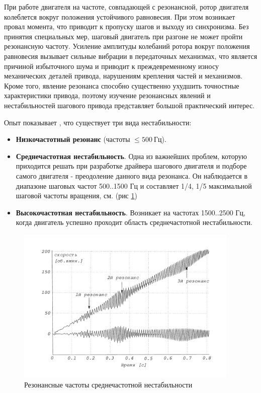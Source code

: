 При работе двигателя на частоте, совпадающей с резонансной, ротор двигателя колеблется вокруг
положения устойчивого равновесия. При этом возникает провал момента, что приводит к пропуску шагов и
выходу из синхронизма. Без принятия специальных мер, шаговый двигатель при разгоне не может пройти резонансную
частоту. Усиление амплитуды колебаний ротора вокруг положения равновесия вызывает сильные вибрации в
передаточных механизмах, что является причиной избыточного шума и приводит к преждевременному износу
механических деталей привода, нарушениям крепления частей и механизмов. Кроме того,
явление резонанса способно существенно ухудшить точностные характеристики привода, поэтому изучение
резонансных явлений и нестабильностей шагового привода представляет большой практический интерес.

Опыт показывает \cite[гл. 9]{RatmirovIvobotenko}, что существует три вида нестабильности:
\begin{itemize}
    \item \textbf{Низкочастотный резонанс} (частоты $ \le 500 ~\textit{Гц}$).

    \item \textbf{Среднечастотная нестабильность}. Одна из важнейших проблем, которую приходится решать при
            разработке драйвера шагового двигателя и подборе самого двигателя - преодоление данного
            вида резонанса. Он наблюдается в диапазоне шаговых частот 500..1500 Гц и составляет
            1/4, 1/5 максимальной шаговой частоты вращения, см. (рис \ref{pic_step_motor_reisonance_plot})

    \item \textbf{Высокочастотная нестабильность}. Возникает на частотах 1500..2500 Гц, когда двигатель успешно
            проходит область среднечастотной нестабильности.
\end{itemize}

\begin{figure}
    \centering
    \includegraphics[width=0.95\textwidth, keepaspectratio]{./src/pictures/step_motor_reisonance_plot}
    \caption{Резонансные частоты среднечастотной нестабильности}
    \label{pic_step_motor_reisonance_plot}
\end{figure}


